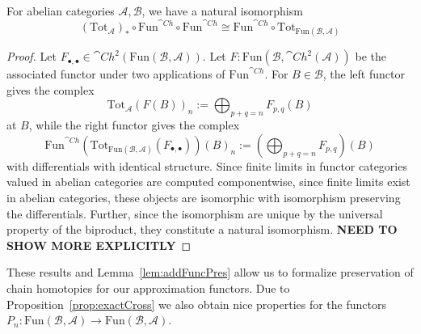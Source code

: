 \begin{lem}[label=lem:totFuncCh]
    For abelian categories $\mathcal{A},\mathcal{B}$, we have a natural isomorphism
    \begin{equation*}
        (\text{Tot}_{\mathcal{A}})_*\circ \text{Fun}^{\cat{Ch}}\circ \text{Fun}^{\cat{Ch}} \cong \text{Fun}^{\cat{Ch}}\circ \text{Tot}_{\text{Fun}(\mathcal{B},\mathcal{A})}
    \end{equation*}
\end{lem}
\begin{proof}
    Let $F_{\bullet,\bullet} \in \cat{Ch}^2(\text{Fun}(\mathcal{B},\mathcal{A}))$. Let $F:\text{Fun}(\mathcal{B},\cat{Ch}^2(\mathcal{A}))$ be the associated functor under two applications of $\text{Fun}^{\cat{Ch}}$. For $B \in \mathcal{B}$, the left functor gives the complex
    \begin{equation*}
        \text{Tot}_{\mathcal{A}}(F(B))_n := \bigoplus_{p+q=n}F_{p,q}(B)
    \end{equation*}
    at $B$, while the right functor gives the complex
    \begin{equation*}
        \text{Fun}^{\cat{Ch}}(\text{Tot}_{\text{Fun}(\mathcal{B},\mathcal{A})}(F_{\bullet,\bullet}))(B)_n := \left(\bigoplus_{p+q=n}F_{p,q}\right)(B)
    \end{equation*}
    with differentials with identical structure. Since finite limits in functor categories valued in abelian categories are computed componentwise, since finite limits exist in abelian categories, these objects are isomorphic with isomorphism preserving the differentials. Further, since the isomorphism are unique by the universal property of the biproduct, they constitute a natural isomorphism. \textbf{NEED TO SHOW MORE EXPLICITLY}
\end{proof}

These results and Lemma~\ref{lem:addFuncPres} allow us to formalize preservation of chain homotopies for our approximation functors. Due to Proposition~\ref{prop:exactCross} we also obtain nice properties for the functors $P_n:\text{Fun}(\mathcal{B},\mathcal{A})\rightarrow \text{Fun}(\mathcal{B},\mathcal{A})$.

